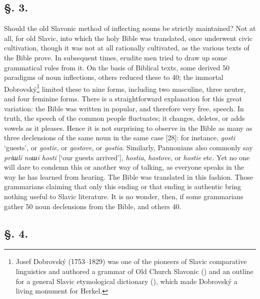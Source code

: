 \subsection*{\hspace*{\fill}§. 3.\hspace*{\fill}}

Should the old Slavonic method of inflecting nouns be strictly maintained? Not at all, for old Slavic, into which the holy Bible was translated, once underwent civic cultivation, though it was not at all rationally cultivated, as the various texts of the Bible prove. In subsequent times, erudite men tried to draw up some grammatical rules from it. On the basis of Biblical texts, some derived 50 paradigms of noun inflections, others reduced these to 40; the immortal Dobrovský\footnote{Josef Dobrovský (1753--1829) was one of the pioneers of Slavic comparative linguistics and authored a grammar of Old Church Slavonic (\citeyear{dobrovsky_institutiones_1822}) and an outline for a general Slavic etymological dictionary (\citeyear{dobrovsky_entwurf_1813}), which made Dobrovský a living monument for Herkel.} limited these to nine forms, including two masculine, three neuter, and four feminine forms. There is a straightforward explanation for this great variation: the Bible was written in popular, and therefore very free, speech. In truth, the speech of the common people fluctuates; it changes, deletes, or adds vowels as it pleases. Hence it is not surprising to observe in the Bible as many as three declensions of the same noun in the same case [28]: for instance, \textit{gosti} ‘guests’, or \textit{gostie}, or \textit{gostove}, or \textit{gostia}. Similarly, Pannonians also commonly say \textit{priшli naшi hosti} [‘our guests arrived’], \textit{hostia}, \textit{hostove}, or \textit{hostie} etc. Yet no one will dare to condemn this or another way of talking, as everyone speaks in the way he has learned from hearing. The Bible was translated in this fashion. Those grammarians claiming that only this ending or that ending is authentic bring nothing useful to Slavic literature. It is no wonder, then, if some grammarians gather 50 noun declensions from the Bible, and others 40.

\subsection*{\hspace*{\fill}§. 4.\hspace*{\fill}}

